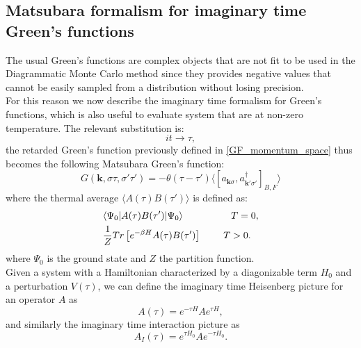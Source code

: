 \subsection{Matsubara formalism for imaginary time Green's functions}
The usual Green's functions are complex objects that are not fit to be used in the Diagrammatic Monte Carlo method since they provides 
negative values that cannot be easily sampled from a distribution without losing precision.\\
For this reason we now describe the imaginary time formalism for Green's functions, which is also useful to evaluate system that are 
at non-zero temperature. The relevant substitution is:
\begin{equation}
    it\to \tau,
    \label{imaginary_time_substitution}
\end{equation}
the retarded Green's function previously defined in \ref{GF_momentum_space} thus becomes the following Matsubara Green's function:
\begin{equation}
    G(\mathbf{k},\sigma\tau,\sigma'\tau')=-\theta(\tau-\tau')\langle [a_{\mathbf{k}\sigma},a^\dagger_{\mathbf{k}'\sigma'}]_{B,F}\rangle
\end{equation}
where the thermal average $\langle A(\tau)B(\tau')\rangle$ is defined as:
\begin{equation}
\begin{split}
    &\langle \Psi_0|A(\tau)B(\tau')|\Psi_0\rangle\hspace{1.75cm}T=0,\\
    &\frac{1}{Z}Tr\left[e^{-\beta H}A(\tau)B(\tau')\right]\hspace{0.8cm}T>0.
\end{split}
\end{equation}
where $\Psi_0$ is the ground state and $Z$ the partition function.\\
Given a system with a Hamiltonian characterized by a diagonizable term $H_0$ and a perturbation $V(\tau)$, we can define the imaginary time 
Heisenberg picture for an operator $A$ as 
\begin{equation}
    A(\tau)=e^{-\tau H}Ae^{\tau H},
\end{equation}
and similarly the imaginary time interaction picture as
\begin{equation}
    A_I(\tau)=e^{\tau H_0}Ae^{-\tau H_0}.
\end{equation}
